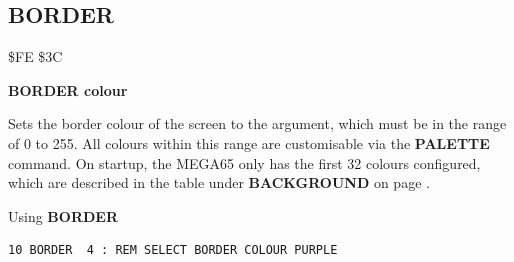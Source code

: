 
\newpage
\subsection{BORDER}
\begin{description}[leftmargin=2cm,style=nextline]
\item [Token:] \$FE \$3C
\item [Format:] {\bf BORDER colour}
\item [Usage:] Sets the border colour
               of the screen to the argument, which must be in the
               range of 0 to 255. All colours within this range are
               customisable via the {\bf PALETTE} command. On
               startup, the MEGA65 only has the first 32 colours configured,
               which are described in the table under {\bf BACKGROUND}
               on page \pageref{colourtable}.

\item [Example:] Using {\bf BORDER}
\begin{tcolorbox}[colback=black,coltext=white]
\verbatimfont{\codefont}
\begin{verbatim}
10 BORDER  4 : REM SELECT BORDER COLOUR PURPLE
\end{verbatim}
\end{tcolorbox}
\end{description}


\newpage
